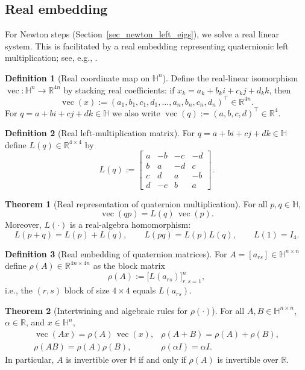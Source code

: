 \documentclass[preprint,12pt]{elsarticle}  %
\theoremstyle{definition}
\newtheorem{Def}{Definition}
\theoremstyle{definition}
\newtheorem{The}{Theorem}
\theoremstyle{definition}
\theoremstyle{definition}
\theoremstyle{definition}
\theoremstyle{remark}
\theoremstyle{remark}
\theoremstyle{remark}
\DeclareRobustCommand{\i}{\ensuremath{\mathbf{i}}}
\DeclareRobustCommand{\j}{\ensuremath{\mathbf{j}}}
\DeclareRobustCommand{\k}{\ensuremath{\mathbf{k}}}
\def\i{i}\def\j{j}\def\k{k}%
\newcommand{\RR}{\mathbb{R}}
\newcommand{\HH}{\mathbb{H}}
\DeclareMathOperator{\rvec}{vec}
\begin{document}
\subsection{Real embedding}
\label{subsec_real_embedding}
For Newton steps (Section~\ref{sec_newton_left_eigs}), we solve a real linear system. This is facilitated by a real embedding representing quaternionic left multiplication; see, e.g.,
\cite{Zhang1997,Rodman2014}.

\begin{Def}[Real coordinate map on $\HH^n$]
\label{def_real_vec_map}
Define the real-linear isomorphism $\rvec:\HH^n\to\RR^{4n}$ by stacking real coefficients:
if $x_k=a_k+b_k\i+c_k\j+d_k\k$, then
\[
\rvec(x):=(a_1,b_1,c_1,d_1,\dots,a_n,b_n,c_n,d_n)^\top\in\RR^{4n}.
\]
For $q=a+b\i+c\j+d\k\in\HH$ we also write $\rvec(q):=(a,b,c,d)^\top\in\RR^4$.
\end{Def}

\begin{Def}[Real left-multiplication matrix]
\label{def_Lq}
For $q=a+b\i+c\j+d\k\in\HH$ define $L(q)\in\RR^{4\times 4}$ by
\begin{equation}
\label{eq_Lq}
L(q):=
\begin{bmatrix}
 a & -b & -c & -d\\
 b &  a & -d &  c\\
 c &  d &  a & -b\\
 d & -c &  b &  a
\end{bmatrix}.
\end{equation}
\end{Def}

\begin{The}[Real representation of quaternion multiplication]
\label{th_Lq_properties}
For all $p,q\in\HH$,
\[
\rvec(qp)=L(q)\,\rvec(p).
\]
Moreover, $L(\cdot)$ is a real-algebra homomorphism:
\[
L(p+q)=L(p)+L(q),\qquad L(pq)=L(p)L(q),\qquad L(1)=I_4.
\]
\end{The}

\begin{Def}[Real embedding of quaternion matrices]
\label{def_rho}
For $A=[a_{rs}]\in\HH^{n\times n}$ define $\rho(A)\in\RR^{4n\times 4n}$ as the block matrix
\[
\rho(A):=\bigl[L(a_{rs})\bigr]_{r,s=1}^n,
\]
i.e., the $(r,s)$ block of size $4\times 4$ equals $L(a_{rs})$.
\end{Def}

\begin{The}[Intertwining and algebraic rules for $\rho(\cdot)$]
\label{th_rho_properties}
For all $A,B\in\HH^{n\times n}$, $\alpha\in\RR$, and $x\in\HH^n$,
\[
\begin{array}{ll}
\rvec(Ax)=\rho(A)\,\rvec(x), & \rho(A+B)=\rho(A)+\rho(B),\\[2pt]
\rho(AB)=\rho(A)\rho(B), & \rho(\alpha I)=\alpha I.
\end{array}
\]
In particular, $A$ is invertible over $\HH$ if and only if $\rho(A)$ is invertible over $\RR$.
\end{The}
\end{document}

